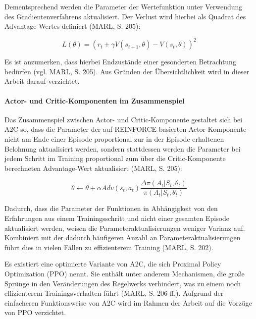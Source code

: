 Dementsprechend werden die Parameter der Wertefunktion unter Verwendung des Gradientenverfahrens aktualisiert. Der Verlust wird hierbei als Quadrat des Advantage-Wertes definiert (MARL, S. 205):

\[ L(\theta) = (r_t + \gamma V(s_{t+1}, \theta) - V(s_t, \theta))^2 \]

Es ist anzumerken, dass hierbei Endzustände einer gesonderten Betrachtung bedürfen (vgl. MARL, S. 205). Aus Gründen der Übersichtlichkeit wird in dieser Arbeit darauf verzichtet.

\paragraph{Actor- und Critic-Komponenten im Zusammenspiel}

Das Zusammenspiel zwischen Actor- und Critic-Komponente gestaltet sich bei A2C so, dass die Parameter der auf REINFORCE basierten Actor-Komponente nicht am Ende einer Episode proportional zur in der Episode erhaltenen Belohnung aktualisiert werden, sondern stattdessen werden die Parameter bei jedem Schritt im Training proportional zum über die Critic-Komponente berechneten Advantage-Wert aktualisiert (MARL, S. 205):

\[ \theta \leftarrow \theta + \alpha Adv(s_t, a_t) \frac{\Delta \pi (A_t|S_t, \theta_t)}{\pi (A_t|S_t, \theta_t)} \]

Dadurch, dass die Parameter der Funktionen in Abhängigkeit von den Erfahrungen aus einem Trainingsschritt und nicht einer gesamten Episode aktualisiert werden, weisen die Parameteraktualisierungen weniger Varianz auf. Kombiniert mit der dadurch häufigeren Anzahl an Parameteraktualisierungen führt dies in vielen Fällen zu effizienterem Training (MARL, S. 202).

Es existiert eine optimierte Variante von A2C, die sich Proximal Policy Optimization (PPO) nennt. Sie enthält unter anderem Mechanismen, die große Sprünge in den Veränderungen des Regelwerks verhindert, was zu einem noch effizienterem Trainingsverhalten führt (MARL, S. 206 ff.). Aufgrund der einfacheren Funktionsweise von A2C wird im Rahmen der Arbeit auf die Vorzüge von PPO verzichtet.
